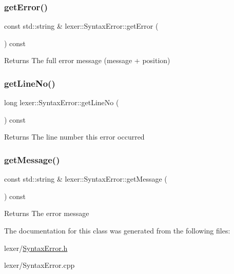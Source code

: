 \subsubsection{\texorpdfstring{get\+Error()}{getError()}}
{\footnotesize\ttfamily const std\+::string \& lexer\+::\+Syntax\+Error\+::get\+Error (\begin{DoxyParamCaption}{ }\end{DoxyParamCaption}) const}

\begin{DoxyReturn}{Returns}
The full error message (message + position) 
\end{DoxyReturn}
\mbox{\label{classlexer_1_1SyntaxError_acb66cecfd69b518b0397df99ed614075}} 
\subsubsection{\texorpdfstring{get\+Line\+No()}{getLineNo()}}
{\footnotesize\ttfamily long lexer\+::\+Syntax\+Error\+::get\+Line\+No (\begin{DoxyParamCaption}{ }\end{DoxyParamCaption}) const}

\begin{DoxyReturn}{Returns}
The line number this error occurred 
\end{DoxyReturn}
\mbox{\label{classlexer_1_1SyntaxError_a3d74d0fc324be531970cc46a3af508ba}} 
\subsubsection{\texorpdfstring{get\+Message()}{getMessage()}}
{\footnotesize\ttfamily const std\+::string \& lexer\+::\+Syntax\+Error\+::get\+Message (\begin{DoxyParamCaption}{ }\end{DoxyParamCaption}) const}

\begin{DoxyReturn}{Returns}
The error message 
\end{DoxyReturn}


The documentation for this class was generated from the following files\+:\begin{DoxyCompactItemize}
\item 
lexer/\hyperlink{SyntaxError_8h}{Syntax\+Error.\+h}\item 
lexer/Syntax\+Error.\+cpp\end{DoxyCompactItemize}
